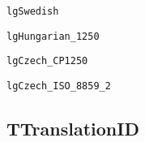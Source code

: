 \documentclass{report}
\newif\ifpdf
\begin{document}
\begin{list}{}
\begin{description}
\item[\texttt{lgSwedish}] \label{PasDoc_Languages-lgSwedish}
\index{}
 
\item[\texttt{lgHungarian{\_}1250}] \label{PasDoc_Languages-lgHungarian_1250}
\index{}
 
\item[\texttt{lgCzech{\_}CP1250}] \label{PasDoc_Languages-lgCzech_CP1250}
\index{}
 
\item[\texttt{lgCzech{\_}ISO{\_}8859{\_}2}] \label{PasDoc_Languages-lgCzech_ISO_8859_2}
\index{}
 
\end{description}


\end{list}
\ifpdf
\subsection*{\large{\textbf{TTranslationID}}\normalsize\hspace{1ex}\hrulefill}
\else
\end{document}
